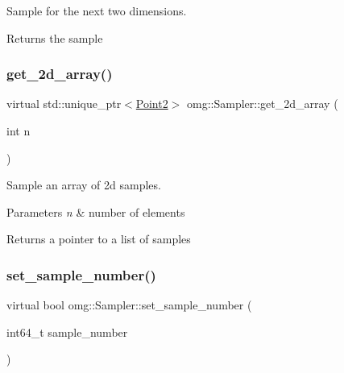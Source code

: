 Sample for the next two dimensions. 

\begin{DoxyReturn}{Returns}
the sample 
\end{DoxyReturn}
\mbox{\label{classomg_1_1_sampler_a3f727fa083652776d02cfe43cf8f24db}} 
\subsubsection{\texorpdfstring{get\_2d\_array()}{get\_2d\_array()}}
{\footnotesize\ttfamily virtual std\+::unique\+\_\+ptr$<$\mbox{\hyperlink{namespaceomg_a18e42fb7bbc4159e9137145b866ec578}{Point2}}$>$ omg\+::\+Sampler\+::get\+\_\+2d\+\_\+array (\begin{DoxyParamCaption}\item[{int}]{n }\end{DoxyParamCaption})\hspace{0.3cm}{\ttfamily [virtual]}}



Sample an array of 2d samples. 


\begin{DoxyParams}{Parameters}
{\em n} & number of elements \\
\hline
\end{DoxyParams}
\begin{DoxyReturn}{Returns}
a pointer to a list of samples 
\end{DoxyReturn}
\mbox{\label{classomg_1_1_sampler_aceffa7bf3f74a77dafb12192b0aaf232}} 
\subsubsection{\texorpdfstring{set\_sample\_number()}{set\_sample\_number()}}
{\footnotesize\ttfamily virtual bool omg\+::\+Sampler\+::set\+\_\+sample\+\_\+number (\begin{DoxyParamCaption}\item[{int64\+\_\+t}]{sample\+\_\+number }\end{DoxyParamCaption})\hspace{0.3cm}{\ttfamily [virtual]}}



